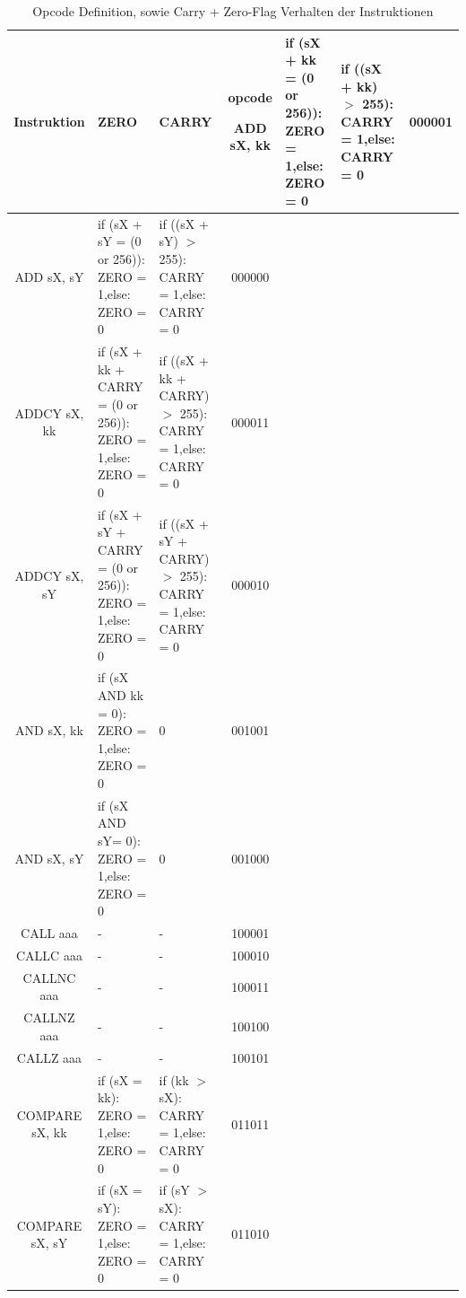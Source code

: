 \documentclass{scrartcl}
\begin{document}
\newpage
\begin{longtable}{||c|p{6cm}|p{6cm}|c||}
\hline \hline
    Instruktion & ZERO & CARRY & opcode   \endhead
    \caption{Opcode Definition, sowie Carry + Zero-Flag Verhalten der Instruktionen} \endfoot
    \hline
    ADD sX, kk & if (sX + kk = (0 or 256)): ZERO = 1,\newline else: ZERO = 0
    & if ((sX + kk) $>$ 255): CARRY = 1,\newline else: CARRY = 0 & 000001 \\ \hline
    ADD sX, sY & if (sX + sY = (0 or 256)): ZERO = 1,\newline else: ZERO = 0
    & if ((sX + sY) $>$ 255): CARRY = 1,\newline else: CARRY = 0 & 000000 \\ \hline
    ADDCY sX, kk & if (sX + kk + CARRY = (0 or 256)): ZERO = 1,\newline else: ZERO = 0
    & if ((sX + kk + CARRY) $>$ 255): CARRY = 1,\newline else: CARRY = 0 & 000011 \\ \hline
    ADDCY sX, sY & if (sX + sY + CARRY = (0 or 256)): ZERO = 1,\newline else: ZERO = 0
    & if ((sX + sY + CARRY) $>$ 255): CARRY = 1,\newline else: CARRY = 0 & 000010 \\ \hline
    AND sX, kk & if (sX AND kk = 0): ZERO = 1,\newline else: ZERO = 0 & 0 & 001001 \\ \hline
    AND sX, sY & if (sX AND sY= 0): ZERO = 1,\newline else: ZERO = 0 & 0 & 001000 \\ \hline
    CALL aaa & - & - & 100001 \\ \hline
    CALLC aaa  & - & - & 100010 \\ \hline
    CALLNC aaa & - & - & 100011 \\ \hline
    CALLNZ aaa & - & - & 100100 \\ \hline
    CALLZ aaa & - & - & 100101 \\ \hline
    COMPARE sX, kk & if (sX = kk): ZERO = 1,\newline else: ZERO = 0
    & if (kk $>$ sX): CARRY = 1,\newline else: CARRY = 0 & 011011 \\ \hline
    COMPARE sX, sY & if (sX = sY): ZERO = 1,\newline else: ZERO = 0
    & if (sY $>$ sX): CARRY = 1,\newline else: CARRY = 0 & 011010 \\ \hline

\end{longtable}
\end{document}
